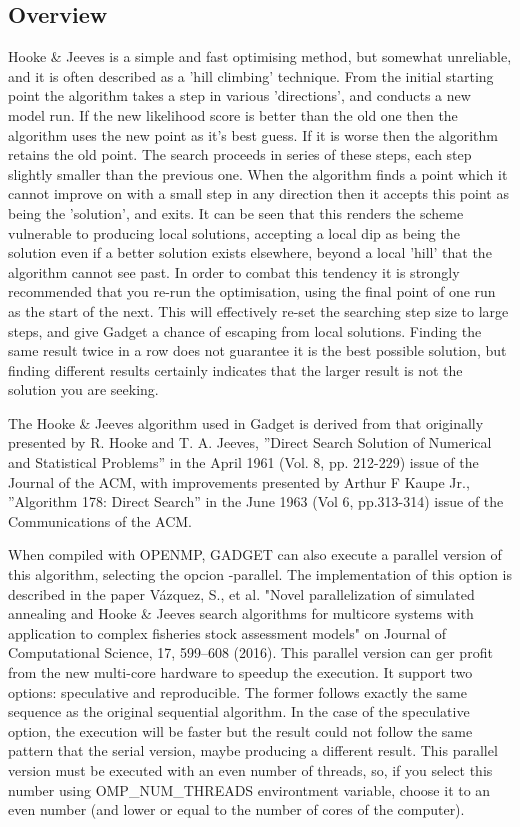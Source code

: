 \documentclass[10pt,twoside]{book}
\begin{document}
\subsection{Overview}\label{subsec:hookeover}
Hooke \& Jeeves is a simple and fast optimising method, but somewhat unreliable, and it is often described as a 'hill climbing' technique.  From the initial starting point the algorithm takes a step in various 'directions', and conducts a new model run.  If the new likelihood score is better than the old one then the algorithm uses the new point as it's best guess.  If it is worse then the algorithm retains the old point.  The search proceeds in series of these steps, each step slightly smaller than the previous one.  When the algorithm finds a point which it cannot improve on with a small step in any direction then it accepts this point as being the 'solution', and exits.  It can be seen that this renders the scheme vulnerable to producing local solutions, accepting a local dip as being the solution even if a better solution exists elsewhere, beyond a local 'hill' that the algorithm cannot see past.  In order to combat this tendency it is strongly recommended that you re-run the optimisation, using the final point of one run as the start of the next.  This will effectively re-set the searching step size to large steps, and give Gadget a chance of escaping from local solutions.  Finding the same result twice in a row does not guarantee it is the best possible solution, but finding different results certainly indicates that the larger result is not the solution you are seeking.

\bigskip
The Hooke \& Jeeves algorithm used in Gadget is derived from that originally presented by R. Hooke and T. A. Jeeves, ''Direct Search Solution of Numerical and Statistical Problems'' in the April 1961 (Vol. 8, pp. 212-229) issue of the Journal of the ACM, with improvements presented by Arthur F Kaupe Jr., ''Algorithm 178: Direct Search'' in the June 1963 (Vol 6, pp.313-314) issue of the Communications of the ACM.

\bigskip
When compiled with OPENMP, GADGET can also execute a parallel version of this algorithm, selecting the opcion -parallel. The implementation of this option is described in the paper Vázquez, S., et al. "Novel parallelization of simulated annealing and Hooke \& Jeeves search algorithms for multicore systems with application to complex fisheries stock assessment models" on Journal of Computational Science, 17, 599–608 (2016). This parallel version can ger profit from the new multi-core hardware to speedup the execution. It support two options: speculative and reproducible. The former follows exactly the same sequence as the original sequential algorithm. In the case of the speculative option, the execution will be faster but the result could not follow the same pattern that the serial version, maybe producing a different result. This parallel version must be executed with an even number of threads, so, if you select this number using OMP\_NUM\_THREADS environtment variable, choose it to an even number (and lower or equal to the number of cores of the computer).
\end{document}
